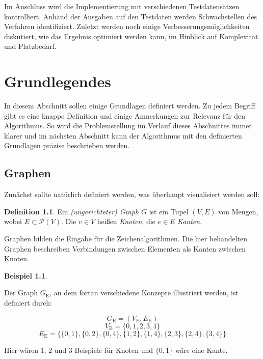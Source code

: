 \documentclass[a4paper]{scrreprt}
\theoremstyle{definition}
\newtheorem{definition}[satz]{Definition}
\newtheorem{example}[satz]{Beispiel}
\begin{document}
Im Anschluss wird die Implementierung mit verschiedenen Testdatensätzen kontrolliert. Anhand
der Ausgaben auf den Testdaten werden Schwachstellen des Verfahren identifiziert. 
Zuletzt werden noch einige Verbesserungsmöglichkeiten diskutiert, wie das Ergebnis
optimiert werden kann, im Hinblick auf Komplexität und Platzbedarf.








\chapter{Grundlegendes}
\label{chap:basics}

In diesem Abschnitt sollen einige Grundlagen definiert werden. Zu jedem Begriff gibt es eine knappe Definition und einige Anmerkungen zur Relevanz für den Algorithmus. So wird die Problemstellung im Verlauf dieses Abschnittes immer klarer und im nächsten Abschnitt kann der Algorithmus mit den definierten Grundlagen präzise beschrieben werden.

\section{Graphen}

Zunächst sollte natürlich definiert werden, was überhaupt visualisiert werden soll:

\begin{definition}
  Ein \emph{(ungerichteter) Graph} $G$ ist ein Tupel $(V, E)$ von Mengen, wobei $E \subset \mathcal{P}(V)$.
  Die $v \in V$ heißen \emph{Knoten}, die $e \in E$ \emph{Kanten}.
\end{definition}

Graphen bilden die Eingabe für die Zeichenalgorithmen. Die hier behandelten Graphen beschreiben Verbindungen zwischen Elementen als Kanten zwischen Knoten. 

\begin{example}
  \label{ex:graph}

Der Graph $G_\text{E}$, an dem fortan verschiedene Konzepte illustriert werden, ist definiert durch:

\[G_\text{E} = (V_\text{E}, E_\text{E})\]
\[V_\text{E} = \{0, 1, 2, 3, 4\}\]
\[E_\text{E} = \{\{0, 1\}, \{0, 2\}, \{0, 4\}, \{1, 2\}, \{1, 4\}, \{2, 3\}, \{2, 4\}, \{3, 4\}\}\]

Hier wären 1, 2 und 3 Beispiele für Knoten und $\{0, 1\}$ wäre eine Kante.
\end{example}
\end{document}
